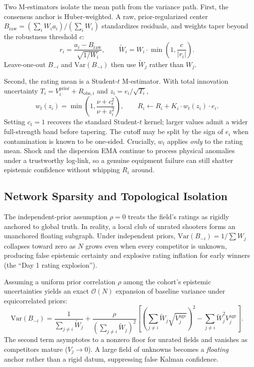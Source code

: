 \documentclass[12pt]{article}
\newcommand{\rhoc}{\rho}        %
\newcommand{\nudof}{\nu}       %
\newcommand{\ctcut}{c_t}       %
\newcommand{\cthresh}{c}        %
\begin{document}
	Two M-estimators isolate the mean path from the variance path. First, the consensus anchor is Huber-weighted. A raw, prior-regularized center $B_{\mathrm{raw}} = (\sum_i W_i a_i)/(\sum_i W_i)$ standardizes residuals, and weights taper beyond the robustness threshold $\cthresh$:
	\begin{equation}
		r_i = \frac{a_i - B_{\mathrm{raw}}}{\sqrt{1/W_i}}, \qquad
		\tilde{W}_i = W_i \cdot \min\!\left(1, \frac{\cthresh}{|r_i|}\right).
	\end{equation}
	Leave-one-out $B_{-i}$ and $\mathrm{Var}(B_{-i})$ then use $\tilde{W}_j$ rather than $W_j$.
	
	Second, the rating mean is a Student-$t$ M-estimator. With total innovation uncertainty $T_i = V_i^{\mathrm{prior}} + R_{\mathrm{obs},i}$ and $z_i = e_i / \sqrt{T_i}$,
	\begin{equation}
		w_t(z_i) = \min\!\left(1,\frac{\nudof + \ctcut^2}{\nudof + z_i^2}\right), \qquad
		R_i \leftarrow R_i + K_i \cdot w_t(z_i) \cdot e_i.
	\end{equation}
	Setting $\ctcut = 1$ recovers the standard Student-$t$ kernel; larger values admit a wider full-strength band before tapering. The cutoff may be split by the sign of $e_i$ when contamination is known to be one-sided. Crucially, $w_t$ applies \emph{only} to the rating mean. Shock and the dispersion EMA continue to process physical anomalies under a trustworthy log-link, so a genuine equipment failure can still shatter epistemic confidence without whipping $R_i$ around.
	
	\subsection{Network Sparsity and Topological Isolation}
	\label{sec:sparsity}
	The independent-prior assumption $\rhoc = 0$ treats the field's ratings as rigidly anchored to global truth. In reality, a local club of unrated shooters forms an unanchored floating subgraph. Under independent priors, $\mathrm{Var}(B_{-i}) = 1/\sum W_j$ collapses toward zero as $N$ grows even when every competitor is unknown, producing false epistemic certainty and explosive rating inflation for early winners (the ``Day 1 rating explosion'').
	
	Assuming a uniform prior correlation $\rhoc$ among the cohort's epistemic uncertainties yields an exact $\mathcal{O}(N)$ expansion of baseline variance under equicorrelated priors:
	\begin{equation}
		\mathrm{Var}(B_{-i}) = \frac{1}{\sum_{j \neq i} \tilde{W}_j} + \frac{\rhoc}{\left(\sum_{j \neq i} \tilde{W}_j\right)^2} \left[ \left( \sum_{j \neq i} \tilde{W}_j \sqrt{V_j^{\mathrm{age}}} \right)^2 - \sum_{j \neq i} \tilde{W}_j^2 V_j^{\mathrm{age}} \right].
	\end{equation}
	The second term asymptotes to a nonzero floor for unrated fields and vanishes as competitors mature ($V_j \to 0$). A large field of unknowns becomes a \emph{floating} anchor rather than a rigid datum, suppressing false Kalman confidence.
	
\end{document}
